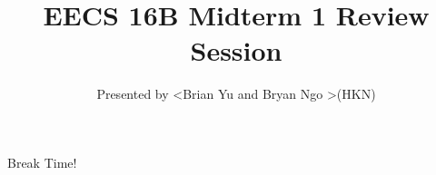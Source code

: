 

\title{EECS 16B Midterm 1 Review Session}
\author{Presented by \textless Brian Yu and Bryan Ngo \textgreater (HKN)}
\date{}

\newcommand{\SlideAccessingLogistics}{@775}






    
    




	\begin{frame}
	    Break Time!
	\end{frame}









